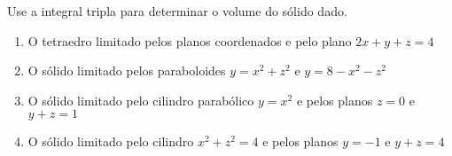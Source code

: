 	\vspace{5mm}
	
	Use a integral tripla para determinar o volume do sólido dado.
	
	\begin{enumerate}[resume]
	
		\item O tetraedro limitado pelos planos coordenados e pelo plano $2x + y + z = 4$
		
		\item O sólido limitado pelos paraboloides $y = x^2 + z^2$ e $y = 8 - x^2 - z^2$
		\resposta{$16\pi$}
		
		\item O sólido limitado pelo cilindro parabólico $y = x^2$ e pelos planos $z = 0$ e $y + z = 1$
		
		\item O sólido limitado pelo cilindro $x^2 + z^2 = 4$ e pelos planos $y = -1$ e $y + z = 4$
		\resposta{$20\pi$}
	
	\end{enumerate}
			
	\vspace{5mm}	
	
	


